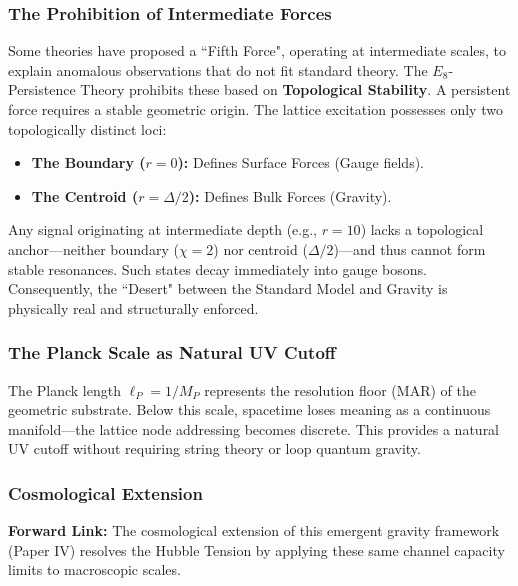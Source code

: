 \subsubsection{The Prohibition of Intermediate Forces}
Some theories have proposed a ``Fifth Force", operating at intermediate scales, to explain anomalous observations that do not fit standard theory. The $E_8$-Persistence Theory prohibits these based on \textbf{Topological Stability}. A persistent force requires a stable geometric origin. The lattice excitation possesses only two topologically distinct loci:
\begin{itemize}
    \item \textbf{The Boundary ($r=0$):} Defines Surface Forces (Gauge fields).
    \item \textbf{The Centroid ($r=\Delta/2$):} Defines Bulk Forces (Gravity).
\end{itemize}
Any signal originating at intermediate depth (e.g., $r=10$) lacks a topological anchor—neither boundary ($\chi=2$) nor centroid ($\Delta/2$)—and thus cannot form stable resonances. Such states decay immediately into gauge bosons. Consequently, the ``Desert" between the Standard Model and Gravity is physically real and structurally enforced.

\subsubsection{The Planck Scale as Natural UV Cutoff}
The Planck length $\ell_P = 1/M_P$ represents the resolution floor (MAR) of the geometric substrate. Below this scale, spacetime loses meaning as a continuous manifold—the lattice node addressing becomes discrete. This provides a natural UV cutoff without requiring string theory or loop quantum gravity.

\subsubsection{Cosmological Extension}
\textbf{Forward Link:} The cosmological extension of this emergent gravity framework (Paper IV) resolves the Hubble Tension by applying these same channel capacity limits to macroscopic scales.
